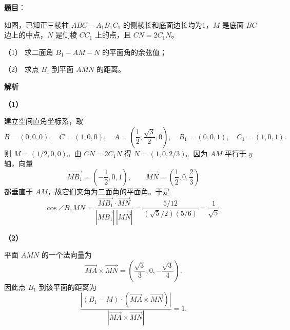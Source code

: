\begin{answer}

\textbf{题目}：

如图，已知正三棱柱 $ABC-A_1B_1C_1$ 的侧棱长和底面边长均为1，$M$ 是底面 $BC$ 边上的中点，$N$ 是侧棱 $CC_1$ 上的点，且 $CN=2C_1N$。
\nopagebreak[4]
\begin{center}\end{center}
\nopagebreak[4]
（1） 求二面角 $B_1-AM-N$ 的平面角的余弦值；

（2） 求点 $B_1$ 到平面 $AMN$ 的距离。

\textbf{解析}

\textbf{（1）}

建立空间直角坐标系，取
\nopagebreak[4]
\[
B=(0,0,0),\quad C=(1,0,0),\quad A=\left(\frac12,\frac{\sqrt3}{2},0\right),\quad
B_1=(0,0,1),\quad C_1=(1,0,1).
\]
则 $M=(1/2,0,0)$。由 $CN=2C_1N$ 得 $N=(1,0,2/3)$。因为 $AM$ 平行于 $y$ 轴，向量
\nopagebreak[4]
\[
\overrightarrow{MB_1}=\left(-\frac12,0,1\right),\qquad
\overrightarrow{MN}=\left(\frac12,0,\frac23\right)
\]
都垂直于 $AM$，故它们夹角为二面角的平面角。于是
\nopagebreak[4]
\[
\cos\angle B_1MN
=\frac{\overrightarrow{MB_1}\cdot\overrightarrow{MN}}
{|\overrightarrow{MB_1}|\,|\overrightarrow{MN}|}
=\frac{5/12}{(\sqrt5/2)(5/6)}=\frac1{\sqrt5}.
\]

\textbf{（2）}

平面 $AMN$ 的一个法向量为
\nopagebreak[4]
\[
\overrightarrow{MA}\times\overrightarrow{MN}
=\left(\frac{\sqrt3}{3},0,-\frac{\sqrt3}{4}\right).
\]
因此点 $B_1$ 到该平面的距离为
\nopagebreak[4]
\[
\frac{|(B_1-M)\cdot(\overrightarrow{MA}\times\overrightarrow{MN})|}
{|\overrightarrow{MA}\times\overrightarrow{MN}|}=1.
\]



\end{answer}
